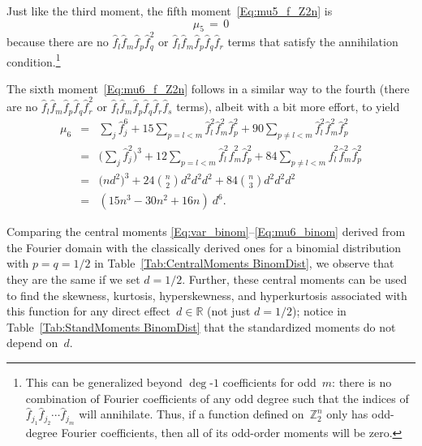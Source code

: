 \documentclass[letterpaper,11pt]{article}
\newcommand{\gr}[1]{( #1 )}
\newcommand{\Gr}[1]{\big( #1 \big)}
\newcommand{\GR}[1]{\Big( #1 \Big)}
\newcommand{\Real}{\mathbb R}
\newcommand{\Int}{\mathbb Z}
\theoremstyle{definition} \newtheorem{remark}{Remark}
\begin{document}
Just like the third moment, the fifth moment~\eqref{Eq:mu5_f_Z2n} is
\begin{equation} \label{Eq:mu5_binom}
\mu_5 \,=\, 0
\end{equation}
because there are no $\hat{f}_l \hat{f}_m \hat{f}_p \hat{f}_q^2$ or $\hat{f}_l \hat{f}_m \hat{f}_p \hat{f}_q \hat{f}_r$ terms that satisfy the annihilation condition.\footnote{This can be generalized beyond $\deg$-$1$ coefficients for odd~$m$: there is no combination of Fourier coefficients of any odd degree such that the indices of $\hat{f}_{j_1} \hat{f}_{j_2} \cdots \hat{f}_{j_m}$ will annihilate. Thus, if a function defined on~$\Int_2^n$ only has odd-degree Fourier coefficients, then all of its odd-order moments will be zero.}

The sixth moment~\eqref{Eq:mu6_f_Z2n} follows in a similar way to the fourth (there are no $\hat{f}_l \hat{f}_m \hat{f}_p \hat{f}_q \hat{f}_r^2$ or $\hat{f}_l \hat{f}_m \hat{f}_p \hat{f}_q \hat{f}_r \hat{f}_s$ terms), albeit with a bit more effort, to yield
\begin{eqnarray} \label{Eq:mu6_binom}
\mu_6 &=& \sum_j \hat{f}_j^6 + 15 \sum_{p=l<m} \hat{f}_l^2 \hat{f}_m^2 \hat{f}_p^2 + 90 \sum_{p\neq l<m} \hat{f}_l^2 \hat{f}_m^2 \hat{f}_p^2 \nonumber \\[2pt]
&=& \GR{\sum_j \hat{f}_j^2}^3 + 12 \sum_{p=l<m} \hat{f}_l^2 \hat{f}_m^2 \hat{f}_p^2 + 84 \sum_{p\neq l<m} \hat{f}_l^2 \hat{f}_m^2 \hat{f}_p^2 \nonumber \\[2pt]
&=& \Gr{nd^2}^3 + 24\binom{n}{2}d^2d^2d^2 + 84\binom{n}{3}d^2d^2d^2 \nonumber \\[5pt]
&=& \gr{15n^3-30n^2+16n} \:\! d^6.
\end{eqnarray}

Comparing the central moments \eqref{Eq:var_binom}--\eqref{Eq:mu6_binom} derived from the Fourier domain with the classically derived ones for a binomial distribution with $p=q=1/2$ in Table~\ref{Tab:CentralMoments BinomDist}, we observe that they are the same if we set $d=1/2$. Further, these central moments can be used to find the skewness, kurtosis, hyperskewness, and hyperkurtosis associated with this function for any direct effect~$d\in\Real$ (not just $d=1/2$); notice in Table~\ref{Tab:StandMoments BinomDist} that the standardized moments do not depend on~$d$.
\end{document}
